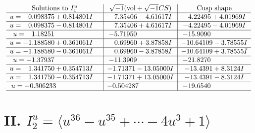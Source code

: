 \documentclass[1p]{elsarticle_modified}
\theoremstyle{definition}
\newcommand{\I}{\sqrt{-1}}
\begin{document}
$$\begin{array}{c|c|c}  
\text{Solutions to }I^u_{1}& \I (\text{vol} + \sqrt{-1}CS) & \text{Cusp shape}\\
 \hline 
\begin{aligned}
u &= \phantom{-}0.098375 + 0.814801 I\end{aligned}
 & \phantom{-}7.35406 - 4.61617 I & -4.22495 + 4.01969 I \\ \hline\begin{aligned}
u &= \phantom{-}0.098375 - 0.814801 I\end{aligned}
 & \phantom{-}7.35406 + 4.61617 I & -4.22495 - 4.01969 I \\ \hline\begin{aligned}
u &= \phantom{-}1.18251\phantom{ +0.000000I}\end{aligned}
 & -5.71950\phantom{ +0.000000I} & -15.9090\phantom{ +0.000000I} \\ \hline\begin{aligned}
u &= -1.188580 + 0.361061 I\end{aligned}
 & \phantom{-}0.69960 + 3.87858 I & -10.64109 - 3.78555 I \\ \hline\begin{aligned}
u &= -1.188580 - 0.361061 I\end{aligned}
 & \phantom{-}0.69960 - 3.87858 I & -10.64109 + 3.78555 I \\ \hline\begin{aligned}
u &= -1.37937\phantom{ +0.000000I}\end{aligned}
 & -11.3909\phantom{ +0.000000I} & -21.8270\phantom{ +0.000000I} \\ \hline\begin{aligned}
u &= \phantom{-}1.341750 + 0.354713 I\end{aligned}
 & -1.71371 - 13.05000 I & -13.4391 + 8.3124 I \\ \hline\begin{aligned}
u &= \phantom{-}1.341750 - 0.354713 I\end{aligned}
 & -1.71371 + 13.05000 I & -13.4391 - 8.3124 I \\ \hline\begin{aligned}
u &= -0.306233\phantom{ +0.000000I}\end{aligned}
 & -0.504287\phantom{ +0.000000I} & -19.6540\phantom{ +0.000000I}\\
 \hline 
 \end{array}$$\newpage\newpage\renewcommand{\arraystretch}{1}
\centering \section*{II. $I^u_{2}= \langle u^{36}- u^{35}+\cdots-4 u^3+1 \rangle$}
\end{document}
